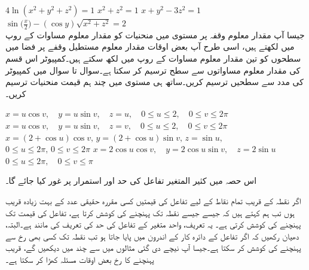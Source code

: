 $4\ln(x^2+y^2+z^2)=1$
$x^2+z^2=1$
$x+y^2-3z^2=1$
$\sin\big(\frac{x}{2}\big)-(\cos y)\sqrt{x^2+z^2}=2$
\\
جیسا آپ مقدار معلوم وقفہ  پر  مستوی میں منحنیات کو مقدار معلوم مساوات  کے     روپ میں لکھتے ہیں، اسی طرح آپ بعض اوقات  مقدار معلوم مستطیل وقفے   پر  فضا میں سطحوں کو تین     مقدار معلوم  مساوات   کے  روپ میں لکھ سکتے ہیں۔کمپیوٹر اس قسم کی مقدار معلوم مساواتوں سے سطح  ترسیم کر سکتا ہے۔سوال  تا سوال  میں کمپیوٹر کی مدد سے سطحیں ترسیم کریں۔ساتھ ہی مستوی  میں چند ہم قیمت منحنیات ترسیم کریں۔

$x=u\cos v,\quad y=u\sin v,\quad z=u,\quad 0\le u\le 2,\quad 0\le v\le 2\pi$
$x=u\cos v,\quad y=u\sin v,\quad z=v,\quad 0\le u\le 2,\quad 0\le v\le 2\pi$
$x=(2+\cos u)\cos v,\,y=(2+\cos u)\sin v,\, z=\sin u,$\\
$ 0\le u\le 2\pi,\, 0\le v\le 2\pi$
$x=2\cos u\cos v,\quad y=2\cos u\sin v,\quad z=2\sin u$\\
$0\le u\le 2\pi,\quad 0\le v\le \pi$


اس حصہ میں کثیر المتغیر تفاعل کی حد اور استمرار پر غور کیا جائے گا۔

اگر نقطہ  کے قریب   تمام نقاط  کے لیے تفاعل   کی قیمتیں کسی  مقررہ حقیقی عدد  کے  بہت  زیادہ  قریب ہوں تب ہم کہتے ہیں کہ جیسے جیسے  نقطہ  تک  پہنچنے کی کوشش کرتا ہے، تفاعل  کی قیمت  تک پہنچنے کی کوشش کرتی ہے۔ یہ تعریف، واحد متغیر کے تفاعل کی حد کی تعریف کی مانند ہے۔البتہ، دھیان  رکھیں  کہ اگر  تفاعل   کے دائرہ کار  کے اندرون میں پایا جاتا ہو تب  نقطہ  تک کسی بھی رخ سے پہنچنے کی کوشش کر سکتا ہے۔جیسا آپ نیچے  دی گئی   مثالوں میں سے چند  میں دیکھیں گے،  قریب پہنچنے کا رخ بعض اوقات مسئلہ کھڑا کر سکتا ہے۔

